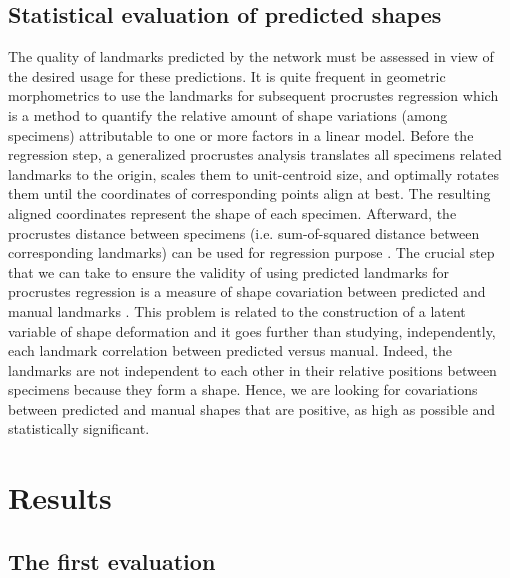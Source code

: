 \documentclass[review]{elsarticle}
\begin{document}
\subsection{Statistical evaluation of predicted shapes}
\label{subsec24}
The quality of landmarks predicted by the network must be assessed in view of the desired usage for these predictions. It is quite frequent in geometric morphometrics to use the landmarks for subsequent procrustes regression \cite{adams_geomorph_2013} which is a method to quantify the relative amount of shape variations (among specimens) attributable to one or more factors in a linear model. 
Before the regression step, a generalized procrustes analysis \cite{adams_geomorph_2013} translates all specimens related landmarks to the origin, scales them to unit-centroid size, and optimally rotates them until the coordinates of corresponding points align at best. The resulting aligned coordinates represent the shape of each specimen. Afterward, the procrustes distance between specimens (i.e. sum-of-squared distance between corresponding landmarks) can be used for regression purpose \cite{goodall_procrustes_1991}. 
The crucial step that we can take to ensure the validity of using predicted landmarks for procrustes regression is a measure of shape covariation between predicted and manual landmarks \cite{rohlf_use_2000}. 
This problem is related to the construction of a latent variable of shape deformation and it goes further than studying, independently, each landmark correlation between predicted versus manual. Indeed, the landmarks are not independent to each other in their relative positions between specimens because they form a shape. Hence, we are looking for covariations between predicted and manual shapes that are positive, as high as possible  and statistically significant. 

\section{Results}
\label{sec3}
\subsection{The first evaluation}
\label{subsec31}
\end{document}
